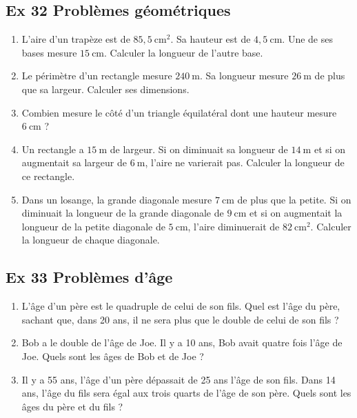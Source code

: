 \documentclass[a4paper,11pt]{article}
\begin{document}
\bigskip

\subsection*{Ex 32 \; Problèmes géométriques}
\begin{enumerate}
  \item L’aire d’un trapèze est de \(85{,}5\ \text{cm}^2\). Sa hauteur est de \(4{,}5\ \text{cm}\). Une de ses bases mesure \(15\ \text{cm}\). Calculer la longueur de l’autre base.
  \item Le périmètre d’un rectangle mesure \(240\ \text{m}\). Sa longueur mesure \(26\ \text{m}\) de plus que sa largeur. Calculer ses dimensions.
  \item Combien mesure le côté d’un triangle équilatéral dont une hauteur mesure \(6\ \text{cm}\) ?
  \item Un rectangle a \(15\ \text{m}\) de largeur. Si on diminuait sa longueur de \(14\ \text{m}\) et si on augmentait sa largeur de \(6\ \text{m}\), l’aire ne varierait pas. Calculer la longueur de ce rectangle.
  \item Dans un losange, la grande diagonale mesure \(7\ \text{cm}\) de plus que la petite. Si on diminuait la longueur de la grande diagonale de \(9\ \text{cm}\) et si on augmentait la longueur de la petite diagonale de \(5\ \text{cm}\), l’aire diminuerait de \(82\ \text{cm}^2\). Calculer la longueur de chaque diagonale.
\end{enumerate}

\bigskip

\subsection*{Ex 33 \; Problèmes d’âge}
\begin{enumerate}
  \item L’âge d’un père est le quadruple de celui de son fils. Quel est l’âge du père, sachant que, dans 20 ans, il ne sera plus que le double de celui de son fils ?
  \item Bob a le double de l’âge de Joe. Il y a 10 ans, Bob avait quatre fois l’âge de Joe. Quels sont les âges de Bob et de Joe ?
  \item Il y a 55 ans, l’âge d’un père dépassait de 25 ans l’âge de son fils. Dans 14 ans, l’âge du fils sera égal aux trois quarts de l’âge de son père. Quels sont les âges du père et du fils ?
\end{enumerate}

\bigskip
\end{document}
